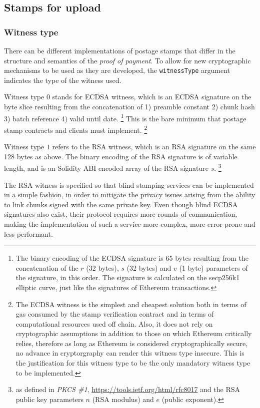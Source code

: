 
\subsection{Stamps for upload}
\subsubsection{Witness type}

There can be different implementations of postage stamps that differ in the structure and semantics of the \emph{proof of payment}. To allow for new cryptographic mechanisms to be used as they are developed, the \lstinline{witnessType} argument indicates the type of the witness used. 

Witness type $0$ stands for ECDSA witness, which is an ECDSA signature on the byte slice resulting from the concatenation of   1) preamble constant 2) chunk hash 3) batch reference 4) valid until date.%
%
\footnote{The binary encoding of the ECDSA signature is 65 bytes resulting from the concatenation of the $r$ (32 bytes), $s$ (32 bytes) and $v$ (1 byte) parameters of the signature, in this order. The signature is calculated on the secp256k1 elliptic curve, just like the signatures of Ethereum transactions.}
%
This is the bare minimum that postage stamp contracts and clients must implement.%
%
\footnote{The ECDSA witness is the simplest and cheapest solution both in terms of gas consumed by the stamp verification contract and in terms of computational resources used off chain. Also, it does not rely on cryptographic assumptions in addition to those on which Ethereum critically relies, therefore as long as Ethereum is considered cryptographically secure, no advance in cryptorgraphy can render this witness type insecure. This is the justification for this witness type to be the only mandatory witness type to be implemented.}

Witness type $1$ refers to the RSA witness, which is an RSA signature on the same 128 bytes as above. The binary encoding of the RSA signature is of variable length, and is an Solidity ABI encoded array of the RSA signature $s$.%
%
\footnote{as defined in \emph{PKCS \#1}, \url{https://tools.ietf.org/html/rfc8017} and the RSA public key parameters $n$ (RSA modulus) and $e$ (public exponent).}

The RSA witness is specified so that blind stamping services can be implemented in a simple fashion, in order to mitigate the privacy issues arising from the ability to link chunks signed with the same private key. Even though blind ECDSA signatures also exist, their protocol requires more rounds of communication, making the implementation of such a service more complex, more error-prone and less performant. 

